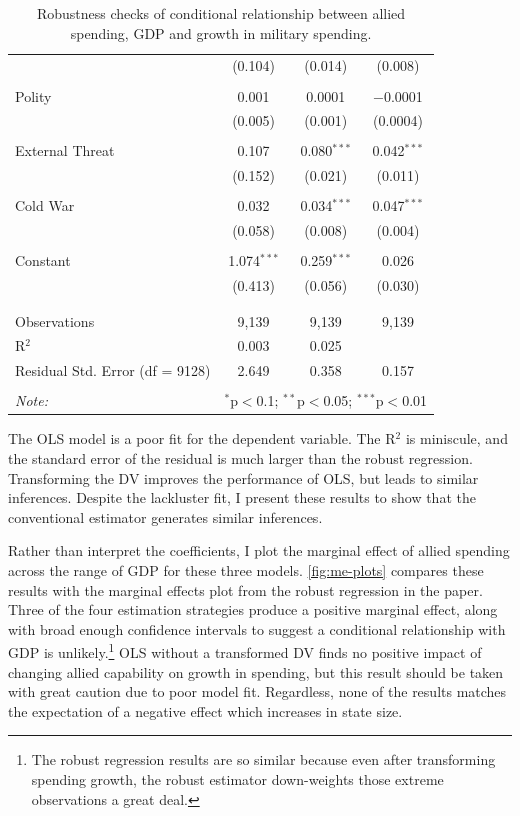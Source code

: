 \documentclass[12pt]{article}
\begin{document}
\begin{table}[!htbp]
\begin{tabular}{@{\extracolsep{5pt}}lccc}
  & (0.104) & (0.014) & (0.008) \\ 
  & & & \\ 
 Polity & 0.001 & 0.0001 & $-$0.0001 \\ 
  & (0.005) & (0.001) & (0.0004) \\ 
  & & & \\ 
 External Threat & 0.107 & 0.080$^{***}$ & 0.042$^{***}$ \\ 
  & (0.152) & (0.021) & (0.011) \\ 
  & & & \\ 
 Cold War & 0.032 & 0.034$^{***}$ & 0.047$^{***}$ \\ 
  & (0.058) & (0.008) & (0.004) \\ 
  & & & \\ 
 Constant & 1.074$^{***}$ & 0.259$^{***}$ & 0.026 \\ 
  & (0.413) & (0.056) & (0.030) \\ 
  & & & \\ 
\hline \\[-1.8ex] 
Observations & 9,139 & 9,139 & 9,139 \\ 
R$^{2}$ & 0.003 & 0.025 &  \\ 
Residual Std. Error (df = 9128) & 2.649 & 0.358 & 0.157 \\ 
\hline 
\hline \\[-1.8ex] 
\textit{Note:}  & \multicolumn{3}{r}{$^{*}$p$<$0.1; $^{**}$p$<$0.05; $^{***}$p$<$0.01} \\ 
\end{tabular} 
\caption{Robustness checks of conditional relationship between allied spending, GDP and growth in military spending. }
\label{tab:ols-est}
\end{table} 


The OLS model is a poor fit for the dependent variable. 
The R$^2$ is miniscule, and the standard error of the residual is much larger than the robust regression. 
Transforming the DV improves the performance of OLS, but leads to similar inferences. 
Despite the lackluster fit, I present these results to show that the conventional estimator generates similar inferences. 


Rather than interpret the coefficients, I plot the marginal effect of allied spending across the range of GDP for these three models.
\autoref{fig:me-plots} compares these results with the marginal effects plot from the robust regression in the paper. 
Three of the four estimation strategies produce a positive marginal effect, along with broad enough confidence intervals to suggest a conditional relationship with GDP is unlikely.\footnote{The robust regression results are so similar because even after transforming spending growth, the robust estimator down-weights those extreme observations a great deal.} 
OLS without a transformed DV finds no positive impact of changing allied capability on growth in spending, but this result should be taken with great caution due to poor model fit. 
Regardless, none of the results matches the expectation of a negative effect which increases in state size. 
\end{document}
